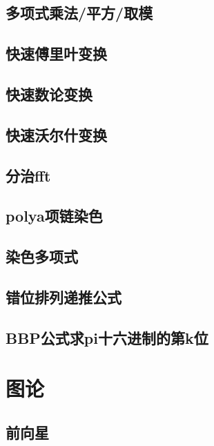 \section{多项式乘法/平方/取模}
\raggedbottom
\hrulefill
\section{快速傅里叶变换}
\raggedbottom
\hrulefill
\section{快速数论变换}
\raggedbottom
\hrulefill
\section{快速沃尔什变换}
\raggedbottom
\hrulefill
\section{分治fft}
\raggedbottom
\hrulefill
\section{polya项链染色}
\raggedbottom
\hrulefill
\section{染色多项式}
\raggedbottom
\hrulefill
\section{	错位排列递推公式}
\raggedbottom
\hrulefill
\section{BBP公式求pi十六进制的第k位}
\raggedbottom
\hrulefill

\chapter{图论}
\section{前向星}
\raggedbottom
\hrulefill
